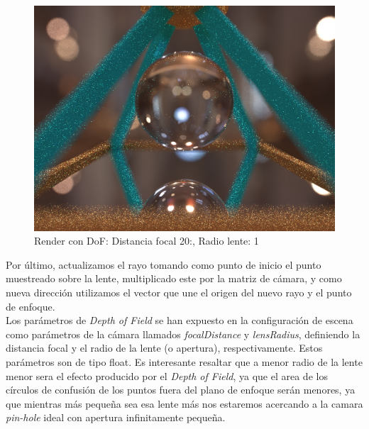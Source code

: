 \documentclass[10pt,oneside,a4paper]{article}
\begin{document}
\begin{figure}[h]
\centering
\includegraphics[width=1\linewidth]{images/escena_2400x1800_128spp_dof20-1_screencap.png}
\caption{Render con DoF: Distancia focal 20:, Radio lente: 1}
\label{fig:disp}
\end{figure}

Por último, actualizamos el rayo tomando como punto de inicio el punto muestreado sobre la lente, multiplicado este por la matriz de cámara, y como nueva dirección utilizamos el vector que une el origen del nuevo rayo y el punto de enfoque.\\

Los parámetros de \emph{Depth of Field} se han expuesto en la configuración de escena como parámetros de la cámara llamados \emph{focalDistance} y \emph{lensRadius}, definiendo la distancia focal y el radio de la lente (o apertura), respectivamente. Estos parámetros son de tipo float. Es interesante resaltar que a menor radio de la lente menor sera el efecto producido por el \textit{Depth of Field}, ya que el area de los círculos de confusión de los puntos fuera del plano de enfoque serán menores, ya que mientras más pequeña sea esa lente más nos estaremos acercando a la camara \textit{pin-hole} ideal con apertura infinitamente pequeña.

\newpage
\end{document}

